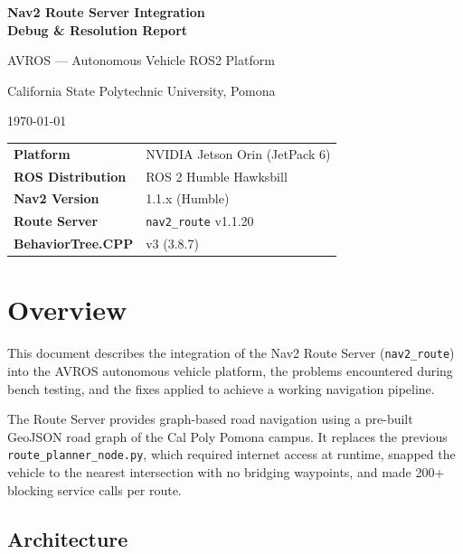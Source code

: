 \documentclass[11pt,a4paper]{article}
\begin{document}
\begin{titlepage}
\centering
\vspace*{2cm}
{\Huge\bfseries Nav2 Route Server Integration\\[0.3cm] Debug \& Resolution Report\par}
\vspace{1.5cm}
{\Large AVROS --- Autonomous Vehicle ROS2 Platform\par}
\vspace{1cm}
{\large California State Polytechnic University, Pomona\par}
\vspace{2cm}
{\large\today\par}
\vspace{2cm}

\begin{tabular}{ll}
\toprule
\textbf{Platform} & NVIDIA Jetson Orin (JetPack 6) \\
\textbf{ROS Distribution} & ROS 2 Humble Hawksbill \\
\textbf{Nav2 Version} & 1.1.x (Humble) \\
\textbf{Route Server} & \texttt{nav2\_route} v1.1.20 \\
\textbf{BehaviorTree.CPP} & v3 (3.8.7) \\
\bottomrule
\end{tabular}

\vfill
\end{titlepage}

\tableofcontents
\newpage

\section{Overview}

This document describes the integration of the Nav2 Route Server (\texttt{nav2\_route}) into the AVROS autonomous vehicle platform, the problems encountered during bench testing, and the fixes applied to achieve a working navigation pipeline.

The Route Server provides graph-based road navigation using a pre-built GeoJSON road graph of the Cal Poly Pomona campus. It replaces the previous \texttt{route\_planner\_node.py}, which required internet access at runtime, snapped the vehicle to the nearest intersection with no bridging waypoints, and made 200+ blocking service calls per route.

\subsection{Architecture}
\end{document}
